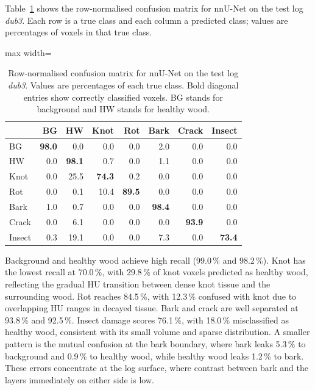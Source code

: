 Table~\ref{tab:cmnnunet} shows the row-normalised confusion matrix for nnU-Net on the test log \textit{dub3}. Each row is a true class and each column a predicted class; values are percentages of voxels in that true class.

\begin{table}[H]
    \centering
    \caption{Row-normalised confusion matrix for nnU-Net on the test log \textit{dub3}. Values are percentages of each true class. Bold diagonal entries show correctly classified voxels. BG stands for background and HW stands for healthy wood.}
    \label{tab:cmnnunet}
    \begin{adjustbox}{max width=\textwidth}
    \begin{tabular}{lrrrrrrr}
        \toprule
        & \textbf{BG} & \textbf{HW} & \textbf{Knot} & \textbf{Rot} & \textbf{Bark} & \textbf{Crack} & \textbf{Insect} \\
        \midrule
        BG     & \textbf{98.0} &  0.0 &  0.0 &  0.0 &  2.0 & 0.0 & 0.0 \\
        HW     &  0.0 & \textbf{98.1} &  0.7 &  0.0 &  1.1 & 0.0 & 0.0 \\
        Knot   &  0.0 & 25.5 & \textbf{74.3} &  0.2 &  0.0 & 0.0 & 0.0 \\
        Rot    &  0.0 &  0.1 & 10.4 & \textbf{89.5} &  0.0 & 0.0 & 0.0 \\
        Bark   &  1.0 &  0.7 &  0.0 &  0.0 & \textbf{98.4} & 0.0 & 0.0 \\
        Crack  &  0.0 &  6.1 &  0.0 &  0.0 &  0.0 & \textbf{93.9} & 0.0 \\
        Insect &  0.3 & 19.1 &  0.0 &  0.0 &  7.3 & 0.0 & \textbf{73.4} \\
        \bottomrule
    \end{tabular}
    \end{adjustbox}
\end{table}

Background and healthy wood achieve high recall (99.0\,\% and 98.2\,\%). Knot has the lowest recall at 70.0\,\%, with 29.8\,\% of knot voxels predicted as healthy wood, reflecting the gradual HU transition between dense knot tissue and the surrounding wood. Rot reaches 84.5\,\%, with 12.3\,\% confused with knot due to overlapping HU ranges in decayed tissue. Bark and crack are well separated at 93.8\,\% and 92.5\,\%. Insect damage scores 76.1\,\%, with 18.0\,\% misclassified as healthy wood, consistent with its small volume and sparse distribution. A smaller pattern is the mutual confusion at the bark boundary, where bark leaks 5.3\,\% to background and 0.9\,\% to healthy wood, while healthy wood leaks 1.2\,\% to bark. These errors concentrate at the log surface, where contrast between bark and the layers immediately on either side is low.


